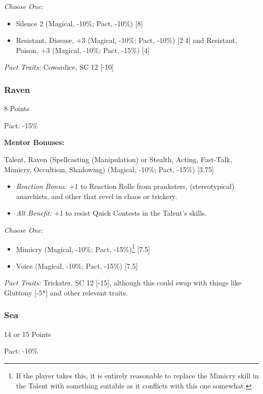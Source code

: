 \begin{multicols}{3}
	\textit{Choose One:}
	\begin{itemize}
		\itemsep 0pt
		\item Silence 2 (Magical, -10\%; Pact, -10\%) [8]
		\item Resistant, Disease, +3 (Magical, -10\%; Pact, -10\%) [2.4] and Resistant, Poison, +3 (Magical, -10\%; Pact, -15\%) [4]
	\end{itemize}
	
	\textit{Pact Traits:} Cowardice, SC 12 [-10]
	
	\subsubsection{Raven}
	\begin{flushright}
		8 Points
	\end{flushright}
	Pact: -15\%
	
	
	\textbf{Mentor Bonuses:} 
	
	Talent, Raven (Spellcasting (Manipulation) or Stealth, Acting, Fast-Talk, Mimicry, Occultism, Shadowing) (Magical, -10\%; Pact, -15\%) [3.75]
	\begin{itemize}
		\itemsep 0pt
		\item \textit{Reaction Bonus:} +1 to Reaction Rolls from pranksters, (stereotypical) anarchists, and other that revel in chaos or trickery.
		\item \textit{Alt Benefit:} +1 to resist Quick Contests in the Talent's skills.
	\end{itemize}
	
	\textit{Choose One:}
	\begin{itemize}
		\itemsep 0pt
		\item Mimicry (Magical, -10\%; Pact, -15\%)\footnote{If the player takes this, it is entirely reasonable to replace the Mimicry skill in the Talent with something suitable as it conflicts with this one somewhat.} [7.5]
		\item Voice (Magical, -10\%; Pact, -15\%) [7.5]
	\end{itemize}
	
	\textit{Pact Traits:} Trickster, SC 12 [-15], although this could swap with things like Gluttony [-5*] and other relevant traits.
	
	\subsubsection{Sea}
	\begin{flushright}
		14 or 15 Points
	\end{flushright}
	Pact: -10\%
	

\end{multicols}
